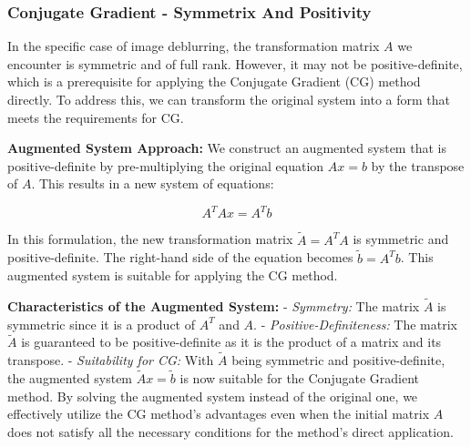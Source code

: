 \documentclass[unicode,11pt,a4paper,oneside,numbers=endperiod,openany]{scrartcl}
\begin{document}
\subsubsection{Conjugate Gradient - Symmetrix And Positivity}
In the specific case of image deblurring, the transformation matrix \( A \) we encounter is symmetric and of full rank. However, it may not be positive-definite, which is a prerequisite for applying the Conjugate Gradient (CG) method directly. To address this, we can transform the original system into a form that meets the requirements for CG.

\textbf{Augmented System Approach:}
We construct an augmented system that is positive-definite by pre-multiplying the original equation \( Ax = b \) by the transpose of \( A \). This results in a new system of equations:

\[
 A^TAx = A^Tb
\]

In this formulation, the new transformation matrix \( \tilde{A} = A^TA \) is symmetric and positive-definite. The right-hand side of the equation becomes \( \tilde{b} = A^Tb \). This augmented system is suitable for applying the CG method.

\textbf{Characteristics of the Augmented System:}\newline\newline
- \textit{Symmetry:} The matrix \( \tilde{A} \) is symmetric since it is a product of \( A^T \) and \( A \).\newline\newline
- \textit{Positive-Definiteness:} The matrix \( \tilde{A} \) is guaranteed to be positive-definite as it is the product of a matrix and its transpose.\newline \newline
- \textit{Suitability for CG:} With \( \tilde{A} \) being symmetric and positive-definite, the augmented system \( \tilde{A}x = \tilde{b} \) is now suitable for the Conjugate Gradient method.
\newline \newline
By solving the augmented system instead of the original one, we effectively utilize the CG method's advantages even when the initial matrix \( A \) does not satisfy all the necessary conditions for the method's direct application.
\end{document}
